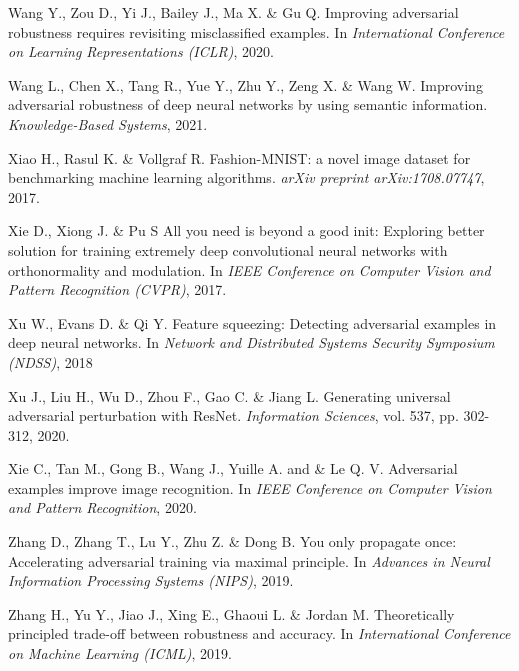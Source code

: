 \documentclass[preprint,review,12pt]{elsarticle}
\numberwithin{equation}{section}
\begin{document}
\begin{thebibliography}{99}
Wang Y., Zou D., Yi J., Bailey J., Ma X. \& Gu Q.
Improving adversarial robustness requires revisiting misclassified examples.
In \textit{International Conference on Learning Representations (ICLR)}, 2020.

Wang L., Chen X., Tang R., Yue Y., Zhu Y., Zeng X. \& Wang W.
Improving adversarial robustness of deep neural networks by using semantic information.
\textit{Knowledge-Based Systems}, 2021.

Xiao H., Rasul K. \& Vollgraf R.
Fashion-MNIST: a novel image dataset for benchmarking machine learning algorithms.
\textit{arXiv preprint arXiv:1708.07747}, 2017.

Xie D., Xiong J. \& Pu S
All you need is beyond a good init: Exploring better
solution for training extremely deep convolutional neural networks with orthonormality and
modulation.
In \textit{IEEE Conference on Computer Vision and Pattern Recognition (CVPR)}, 2017.

Xu W., Evans D. \& Qi Y.
Feature squeezing: Detecting adversarial examples in deep neural networks.
In \textit{Network and Distributed Systems Security Symposium (NDSS)}, 2018

Xu J., Liu H., Wu D., Zhou F., Gao C. \& Jiang L.
Generating universal adversarial perturbation with ResNet.
\textit{Information Sciences}, vol. 537, pp. 302-312, 2020.

Xie C., Tan M., Gong B., Wang J., Yuille A. and \& Le Q. V.
Adversarial examples improve image recognition.
In \textit{IEEE Conference on Computer Vision and Pattern Recognition}, 2020.

Zhang D., Zhang T., Lu Y., Zhu Z. \& Dong B.
 You only propagate once: Accelerating adversarial training via maximal principle.
In \textit{Advances in Neural Information Processing Systems (NIPS)}, 2019.

Zhang H., Yu Y., Jiao J., Xing E., Ghaoui L. \& Jordan M.
Theoretically principled trade-off between robustness and accuracy.
In \textit{ International Conference on Machine Learning (ICML)}, 2019.

\end{thebibliography}
\end{document}

